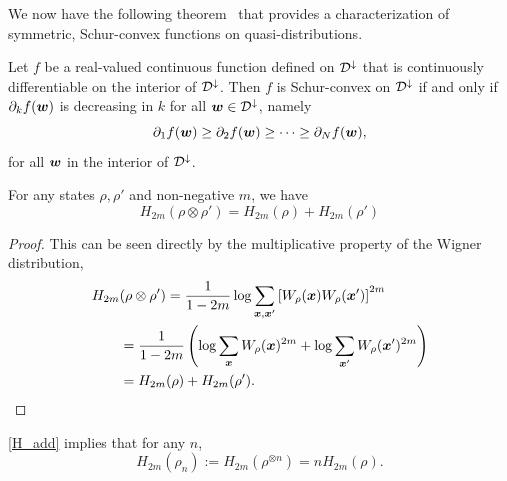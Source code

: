\documentclass[pra,
aps,
twocolumn,
superscriptaddress,
groupedaddress,
nofootinbib,
reprint
]{revtex4-1}
\begin{document}
We now have the following theorem~\cite{cit:marshall} that provides a characterization of symmetric, Schur-convex functions on quasi-distributions.
\begin{theorem} Let $f$ be a real-valued continuous function defined on ${\mathcal D}^\downarrow$ that is continuously differentiable on the interior of ${\mathcal D}^\downarrow$. Then $f$ is Schur-convex on ${\mathcal D}^\downarrow$ if and only if $\partial_k f(\boldsymbol{w})$ is decreasing in $k$ for all $\boldsymbol{w} \in {\mathcal D}^\downarrow$, namely
\begin{equation}
\partial_1 f(\boldsymbol{w}) \ge \partial_2 f(\boldsymbol{w}) \ge \cdots \ge \partial_N f(\boldsymbol{w}),
\end{equation}
for all $\boldsymbol{w}$ in the interior of ${\mathcal D}^\downarrow$.
\end{theorem}

\begin{lemma}[Additivity of $H_{2m}$]\label{H_add}
	For any states $\rho, \rho'$ and non-negative $m$, we have
	\begin{equation}
		H_{2m}(\rho \otimes \rho') = H_{2m}(\rho) + H_{2m}(\rho')
	\end{equation}
\end{lemma}
\begin{proof}
	This can be seen directly by the multiplicative property of the Wigner distribution,
	\begin{align*}
		H_{2m}&(\rho \otimes \rho') = \frac{1}{1-2m}\log \sum_{\bm{x},\bm{x}'} \left[W_{\rho}(\bm{x})W_{\rho}(\bm{x}')\right]^{2m} \\
		&= \frac{1}{1-2m}\left( \log \sum_{\bm{x}}W_{\rho}(\bm{x})^{2m} + \log \sum_{\bm{x}'}W_{\rho}(\bm{x}')^{2m} \right) \\
		&= H_{2m}(\rho) + H_{2m}(\rho').
	\end{align*}
\end{proof}
\cref{H_add} implies that for any $n$,
\begin{equation}
	H_{2m}(\rho_n) := H_{2m}(\rho^{\otimes n}) = n H_{2m}(\rho).
\end{equation}
\end{document}
